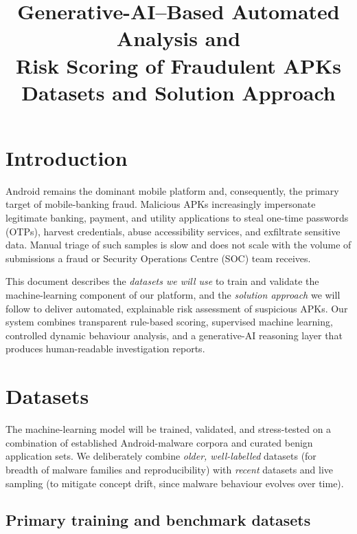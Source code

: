 \documentclass[11pt,a4paper]{article}
\title{\vspace{-1.5em}\textbf{Generative-AI--Based Automated Analysis and\\
Risk Scoring of Fraudulent APKs}\\[0.4em]
\large Datasets and Solution Approach}
\author{}
\date{}
\begin{document}
\maketitle
\vspace{-3em}

\section{Introduction}
Android remains the dominant mobile platform and, consequently, the primary target of
mobile-banking fraud. Malicious APKs increasingly impersonate legitimate banking,
payment, and utility applications to steal one-time passwords (OTPs), harvest
credentials, abuse accessibility services, and exfiltrate sensitive data. Manual triage
of such samples is slow and does not scale with the volume of submissions a fraud or
Security Operations Centre (SOC) team receives.

This document describes the \emph{datasets we will use} to train and validate the
machine-learning component of our platform, and the \emph{solution approach} we will
follow to deliver automated, explainable risk assessment of suspicious APKs. Our system
combines transparent rule-based scoring, supervised machine learning, controlled dynamic
behaviour analysis, and a generative-AI reasoning layer that produces human-readable
investigation reports.

\section{Datasets}
The machine-learning model will be trained, validated, and stress-tested on a
combination of established Android-malware corpora and curated benign application sets.
We deliberately combine \emph{older, well-labelled} datasets (for breadth of malware
families and reproducibility) with \emph{recent} datasets and live sampling (to mitigate
concept drift, since malware behaviour evolves over time).

\subsection{Primary training and benchmark datasets}
\end{document}
